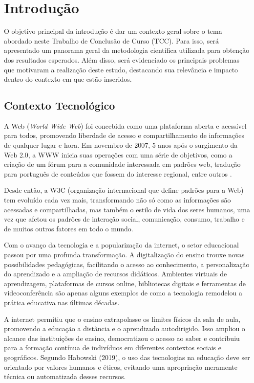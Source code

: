 \chapter[Introdução]{Introdução}
\label{cap:introducao}

O objetivo principal da introdução é dar um contexto geral sobre o tema abordado neste Trabalho de Conclusão de Curso (TCC). Para isso, será apresentado um panorama geral da metodologia científica utilizada para obtenção dos resultados esperados. Além disso, será evidenciado os principais problemas que motivaram a realização deste estudo, destacando sua relevância e impacto dentro do contexto em que estão inseridos. 

\section{Contexto Tecnológico}

A Web (\textit{World Wide Web}) foi concebida como uma plataforma aberta e acessível para todos, promovendo liberdade de acesso e compartilhamento de informações de qualquer lugar e hora. Em novembro de 2007, 5 anos após o surgimento da Web 2.0, a WWW inicia suas operações com uma série de objetivos, como a criação de um fórum para a comunidade interessada em padrões web, tradução para português de conteúdos que fossem do interesse regional, entre outros \cite{vieira2014}.

Desde então, a W3C (organização internacional que define padrões para a Web) tem evoluído cada vez mais, transformando não só como as informações são acessadas e compartilhadas, mas também o estilo de vida dos seres humanos, uma vez que afetou os padrões de interação social, comunicação, consumo, trabalho e de muitos outros fatores em todo o mundo.

Com o avanço da tecnologia e a popularização da internet, o setor educacional passou por uma profunda transformação. A digitalização do ensino trouxe novas possibilidades pedagógicas, facilitando o acesso ao conhecimento, a personalização do aprendizado e a ampliação de recursos didáticos. Ambientes virtuais de aprendizagem, plataformas de cursos online, bibliotecas digitais e ferramentas de videoconferência são apenas alguns exemplos de como a tecnologia remodelou a prática educativa nas últimas décadas.

A internet permitiu que o ensino extrapolasse os limites físicos da sala de aula, promovendo a educação a distância e o aprendizado autodirigido. Isso ampliou o alcance das instituições de ensino, democratizou o acesso ao saber e contribuiu para a formação contínua de indivíduos em diferentes contextos sociais e geográficos. Segundo Habowski (2019), o uso das tecnologias na educação deve ser orientado por valores humanos e éticos, evitando uma apropriação meramente técnica ou automatizada desses recursos.

